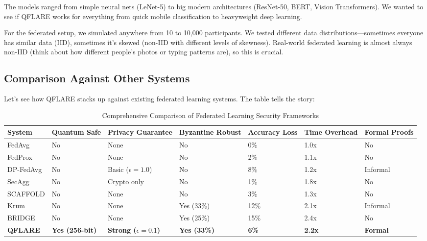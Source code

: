 \documentclass[journal,onecolumn]{IEEEtran}
\begin{document}
The models ranged from simple neural nets (LeNet-5) to big modern architectures (ResNet-50, BERT, Vision Transformers). We wanted to see if QFLARE works for everything from quick mobile classification to heavyweight deep learning.

For the federated setup, we simulated anywhere from 10 to 10,000 participants. We tested different data distributions—sometimes everyone has similar data (IID), sometimes it's skewed (non-IID with different levels of skewness). Real-world federated learning is almost always non-IID (think about how different people's photos or typing patterns are), so this is crucial.

\subsection{Comparison Against Other Systems}

Let's see how QFLARE stacks up against existing federated learning systems. The table tells the story:

\begin{table}[htbp]
\centering
\caption{Comprehensive Comparison of Federated Learning Security Frameworks}
\label{tab:comprehensive_comparison}
\scriptsize
\begin{tabular}{@{}p{2cm}p{1.3cm}p{1.3cm}p{1.3cm}p{1.3cm}p{1.3cm}p{1.3cm}@{}}
\toprule
\textbf{System} & \textbf{Quantum Safe} & \textbf{Privacy Guarantee} & \textbf{Byzantine Robust} & \textbf{Accuracy Loss} & \textbf{Time Overhead} & \textbf{Formal Proofs} \\
\midrule
FedAvg & No & None & No & 0\% & 1.0x & No \\
FedProx & No & None & No & 2\% & 1.1x & No \\
DP-FedAvg & No & Basic ($\epsilon=1.0$) & No & 8\% & 1.2x & Informal \\
SecAgg & No & Crypto only & No & 1\% & 1.8x & No \\
SCAFFOLD & No & None & No & 3\% & 1.3x & No \\
Krum & No & None & Yes (33\%) & 12\% & 2.1x & Informal \\
BRIDGE & No & None & Yes (25\%) & 15\% & 2.4x & No \\
\midrule
\textbf{QFLARE} & \textbf{Yes (256-bit)} & \textbf{Strong ($\epsilon=0.1$)} & \textbf{Yes (33\%)} & \textbf{6\%} & \textbf{2.2x} & \textbf{Formal} \\
\bottomrule
\end{tabular}
\end{table}
\end{document}
